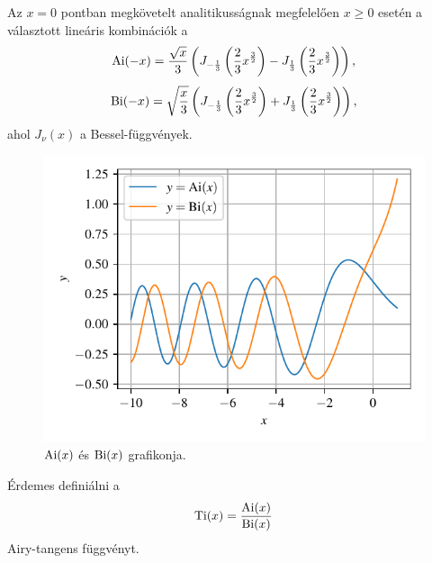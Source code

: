 Az $x=0$ pontban megkövetelt analitikusságnak megfelelően $x \geq 0$ esetén a választott lineáris kombinációk a
\begin{equation}
	\operatorname{Ai}(-x) = \frac{\sqrt{x}}{3}\left(J_{-\frac{1}{3}}\left(\frac{2}{3}x^{\frac{3}{2}}\right)-J_{\frac{1}{3}}\left(\frac{2}{3}x^{\frac{3}{2}}\right)\right),
	\label{airy:ai-}
\end{equation}
\begin{equation}
	\operatorname{Bi}(-x) = \sqrt{\frac{x}{3}}\left(J_{-\frac{1}{3}}\left(\frac{2}{3}x^{\frac{3}{2}}\right)+J_{\frac{1}{3}}\left(\frac{2}{3}x^{\frac{3}{2}}\right)\right),
	\label{airy:bi-}
\end{equation}
ahol $J_\nu(x)$ a Bessel-függvények.
\begin{figure}
	\centering
	\includegraphics[scale=1]{./figs/airy.pdf}
	\caption[Airy-függvények]{$\operatorname{Ai}(x)$ és $\operatorname{Bi}(x)$ grafikonja.}
\end{figure}
Érdemes definiálni a
\begin{equation}
	\operatorname{Ti}(x) = \frac{\operatorname{Ai}(x)}{\operatorname{Bi}(x)}
\end{equation}
Airy-tangens függvényt.

